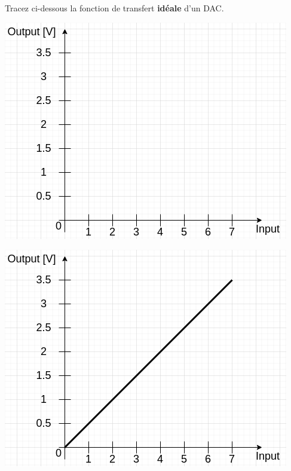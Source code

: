 \documentclass{exam}
\begin{document}
{
Tracez ci-dessous la fonction de transfert \textbf{idéale} d'un DAC.
\begin{center}
	\includegraphics[width=.3\paperwidth]{erreur-conversion_axes.png}
\end{center}
\vspace*{-2cm}
}
{
	\includegraphics[width=.4\paperwidth]{erreur-conversion_axes_ideal.png}
}
\end{document}
